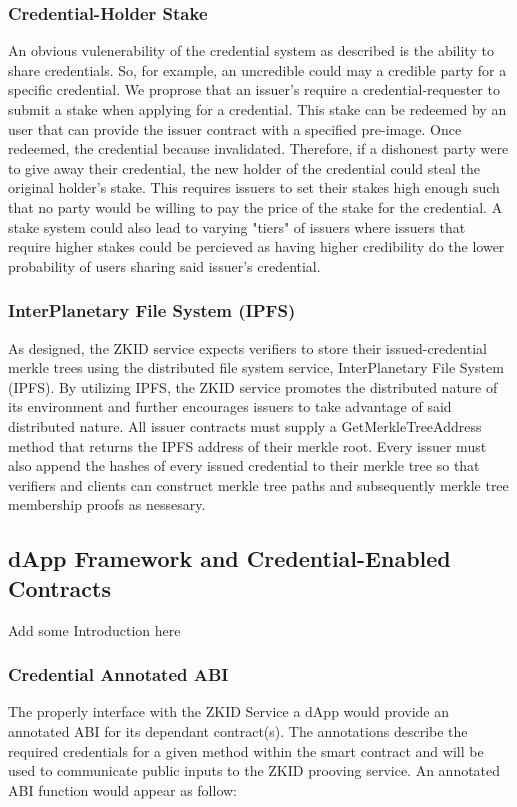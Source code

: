 \documentclass[11 pt]{extarticle}
\theoremstyle{remark}
\begin{document}
\subsubsection{Credential-Holder Stake}

An obvious vulenerability of the credential system as described is the ability to share credentials. So, for example, an uncredible could may
a credible party for a specific credential. We proprose that an issuer's require a credential-requester to submit a stake when 
applying for a credential. This stake can be redeemed by an user that can provide the issuer contract with a specified pre-image. Once 
redeemed, the credential because invalidated. Therefore, if a dishonest party were to give away their credential, the new holder of the credential
could steal the original holder's stake. This requires issuers to set their stakes high enough such that no party would be willing to pay the
price of the stake for the credential. A stake system could also lead to varying "tiers" of issuers where issuers that require higher stakes could be 
percieved as having higher credibility do the lower probability of users sharing said issuer's credential.

\subsubsection{InterPlanetary File System (IPFS)}

As designed, the ZKID service expects verifiers to store their issued-credential merkle trees using the distributed file system service, InterPlanetary File System (IPFS).
By utilizing IPFS, the ZKID service promotes the distributed nature of its environment and further encourages issuers to take advantage of said distributed nature. All issuer
contracts must supply a GetMerkleTreeAddress method that returns the IPFS address of their merkle root. Every issuer must also append the hashes of every issued credential 
to their merkle tree so that verifiers and clients can construct merkle tree paths and subsequently merkle tree membership proofs as nessesary. 

\subsection{dApp Framework and Credential-Enabled Contracts}

Add some Introduction here

\subsubsection{Credential Annotated ABI}
The properly interface with the ZKID Service a dApp would provide an annotated ABI for its dependant contract(s).
The annotations describe the required credentials for a given method within the smart contract and will
be used to communicate public inputs to the ZKID prooving service. An annotated ABI function
would appear as follow:
\end{document}
